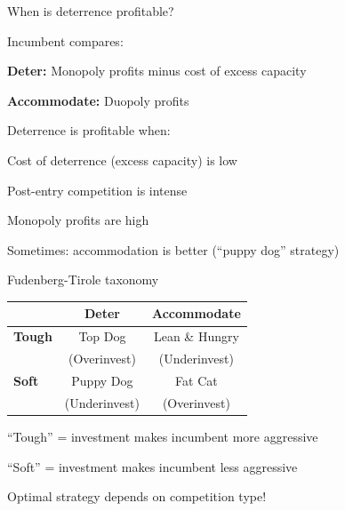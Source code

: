 \documentclass[notes,11pt, aspectratio=169]{beamer}
\newenvironment{wideitemize}{\itemize\addtolength{\itemsep}{10pt}}{\enditemize}
\newenvironment{wideenumerate}{\enumerate\addtolength{\itemsep}{10pt}}{\endenumerate}
\begin{document}
\begin{frame}{When is deterrence profitable?}
	\begin{wideitemize}
		\item Incumbent compares:
		\begin{wideenumerate}
			\vspace{5pt}
			\item \textbf{Deter:} Monopoly profits minus cost of excess capacity
			\item \textbf{Accommodate:} Duopoly profits
		\end{wideenumerate}
		\item Deterrence is profitable when:
		\begin{wideitemize}
			\vspace{5pt}
			\item Cost of deterrence (excess capacity) is low
			\item Post-entry competition is intense
			\item Monopoly profits are high
		\end{wideitemize}
		\item Sometimes: accommodation is better (``puppy dog'' strategy)
	\end{wideitemize}
\end{frame}

\begin{frame}{Fudenberg-Tirole taxonomy}
	\begin{center}
	\begin{tabular}{|l|c|c|}
		\hline
		& \textbf{Deter} & \textbf{Accommodate} \\
		\hline
		\textbf{Tough} & Top Dog & Lean \& Hungry \\
		& (Overinvest) & (Underinvest) \\
		\hline
		\textbf{Soft} & Puppy Dog & Fat Cat \\
		& (Underinvest) & (Overinvest) \\
		\hline
	\end{tabular}
	\end{center}
	\vspace{5pt}
	\begin{wideitemize}
		\item ``Tough'' = investment makes incumbent more aggressive
		\item ``Soft'' = investment makes incumbent less aggressive
		\item Optimal strategy depends on competition type!
	\end{wideitemize}
\end{frame}
\end{document}
